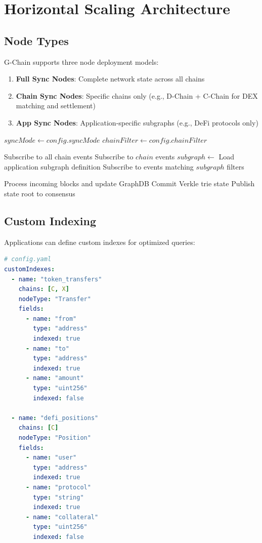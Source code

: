 \section{Horizontal Scaling Architecture}


\subsection{Node Types}

G-Chain supports three node deployment models:

\begin{enumerate}
\item \textbf{Full Sync Nodes}: Complete network state across all chains
\item \textbf{Chain Sync Nodes}: Specific chains only (e.g., D-Chain + C-Chain for DEX matching and settlement)
\item \textbf{App Sync Nodes}: Application-specific subgraphs (e.g., DeFi protocols only)
\end{enumerate}

\begin{algorithm}[H]
\caption{Selective Synchronization}
\begin{algorithmic}[1]
    \State $syncMode \gets config.syncMode$
    \State $chainFilter \gets config.chainFilter$
    
        \State Subscribe to all chain events
            \State Subscribe to $chain$ events
        \EndFor
        \State $subgraph \gets$ Load application subgraph definition
        \State Subscribe to events matching $subgraph$ filters
    \EndIf
    
    \State Process incoming blocks and update GraphDB
    \State Commit Verkle trie state
    \State Publish state root to consensus
\EndFunction
\end{algorithmic}
\end{algorithm}

\subsection{Custom Indexing}

Applications can define custom indexes for optimized queries:

\begin{lstlisting}[language=YAML, basicstyle=\small\ttfamily]
# config.yaml
customIndexes:
  - name: "token_transfers"
    chains: [C, X]
    nodeType: "Transfer"
    fields:
      - name: "from"
        type: "address"
        indexed: true
      - name: "to"
        type: "address"
        indexed: true
      - name: "amount"
        type: "uint256"
        indexed: false
    
  - name: "defi_positions"
    chains: [C]
    nodeType: "Position"
    fields:
      - name: "user"
        type: "address"
        indexed: true
      - name: "protocol"
        type: "string"
        indexed: true
      - name: "collateral"
        type: "uint256"
        indexed: false
\end{lstlisting}

